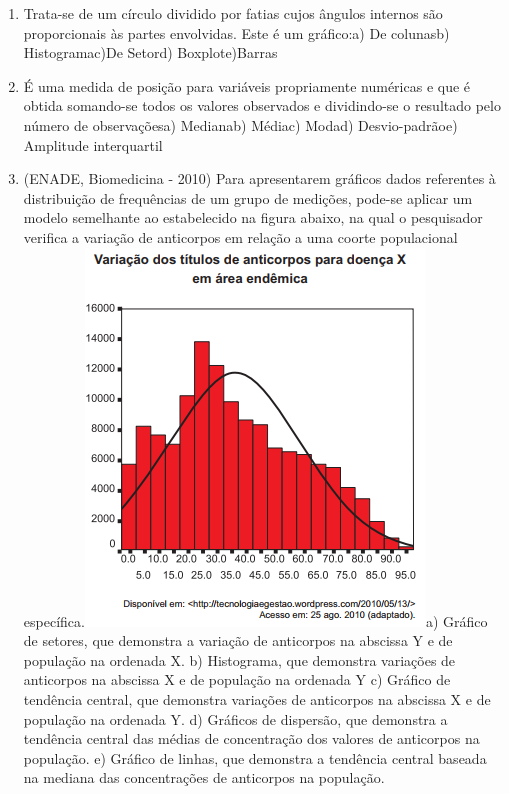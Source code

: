 \documentclass[
]{book}
\providecommand{\tightlist}{%
  \setlength{\itemsep}{0pt}\setlength{\parskip}{0pt}}
\begin{document}
\begin{enumerate}
\def\labelenumi{\arabic{enumi}.}
\tightlist
\item
  Trata-se de um círculo dividido por fatias cujos ângulos internos são proporcionais às partes envolvidas. Este é um gráfico:a) De colunasb) Histogramac)De Setord) Boxplote)Barras
\item
  É uma medida de posição para variáveis propriamente numéricas e que é obtida somando-se todos os valores observados e dividindo-se o resultado pelo número de observaçõesa) Medianab) Médiac) Modad) Desvio-padrãoe) Amplitude interquartil
\item
  (ENADE, Biomedicina - 2010) Para apresentarem gráficos dados referentes à distribuição de frequências de um grupo de medições, pode-se aplicar um modelo semelhante ao estabelecido na figura abaixo, na qual o pesquisador verifica a variação de anticorpos em relação a uma coorte populacional específica.\includegraphics{./img/exercicio_histograma.png}a) Gráfico de setores, que demonstra a variação de anticorpos na abscissa Y e de população na ordenada X. b) Histograma, que demonstra variações de anticorpos na abscissa X e de população na ordenada Y c) Gráfico de tendência central, que demonstra variações de anticorpos na abscissa X e de população na ordenada Y. d) Gráficos de dispersão, que demonstra a tendência central das médias de concentração dos valores de anticorpos na população. e) Gráfico de linhas, que demonstra a tendência central baseada na mediana das concentrações de anticorpos na população.
\end{enumerate}
\end{document}
